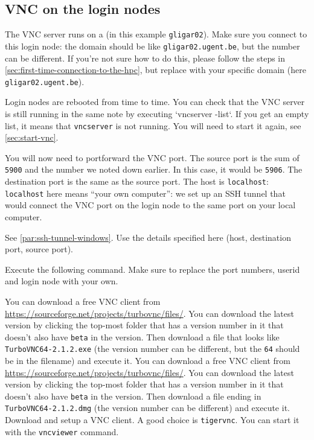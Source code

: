 \subsection{VNC on the login nodes}

The VNC server runs on a  (in this example \lstinline|gligar02|).
Make sure you connect to this login node: the domain should be like \lstinline|gligar02.ugent.be|,
but the number can be different. If you're not sure how to do this, please follow the steps
in \autoref{sec:first-time-connection-to-the-hpc}, but replace \loginnode with your specific
domain (here \lstinline|gligar02.ugent.be|).

Login nodes are rebooted from time to time. You can check that the VNC server is still
running in the same note by executing `vncserver -list`. If you get an empty list,
it means that \lstinline|vncserver| is not running. You will need to start it again,
see \autoref{sec:start-vnc}.

You will now need to portforward the VNC port. The source port is the sum of \lstinline|5900|
and the number we noted down earlier. In this case, it would be \lstinline|5906|.
The destination port is the same as the source port. The host is \lstinline|localhost|:
\lstinline|localhost| here means ``your own computer'': we set up an SSH tunnel that would
connect the VNC port on the login node to the same port on your local computer.

\ifwindows
See \autoref{par:ssh-tunnel-windows}. Use the details specified here (host, destination port,
source port).
\else

Execute the following command. Make sure to replace the port numbers, userid and login node
with your own.

\begin{prompt}
\end{prompt}
\fi

\ifwindows

You can download a free VNC client from \url{https://sourceforge.net/projects/turbovnc/files/}.
You can download the latest version by clicking the top-most folder that has a version number
in it that doesn't also have \lstinline|beta| in the version. Then download a file that looks like
\lstinline|TurboVNC64-2.1.2.exe| (the version number can be different, but the \lstinline|64|
should be in the filename) and execute it.
\fi
\ifmac
You can download a free VNC client from \url{https://sourceforge.net/projects/turbovnc/files/}.
You can download the latest version by clicking the top-most folder that has a version number
in it that doesn't also have \lstinline|beta| in the version. Then download a file ending in
\lstinline|TurboVNC64-2.1.2.dmg| (the version number can be different) and execute it.
\fi
\iflinux
Download and setup a VNC client. A good choice is \lstinline|tigervnc|. You can start
it with the \lstinline|vncviewer| command.
\fi

